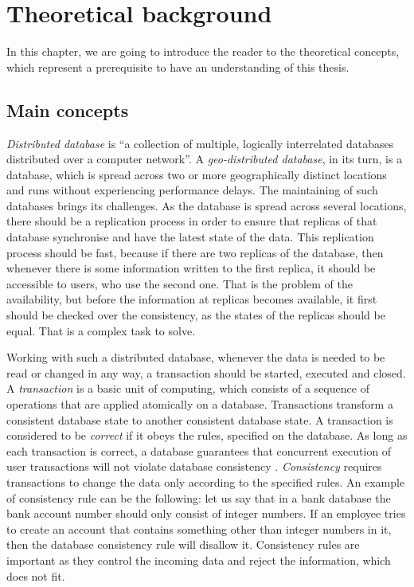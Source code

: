 \chapter{Theoretical background}
\label{Background}

In this chapter, we are going to introduce the reader to the theoretical concepts, which represent a prerequisite to have an understanding of this thesis.

\section{Main concepts}
\label{Background-Main}

\textit{Distributed database} is ``a collection of multiple, logically interrelated databases distributed over a computer network''\cite{11}. A \textit{geo-distributed database}, in its turn, is a database, which is spread across two or more geographically distinct locations and runs without experiencing performance delays. The maintaining of such databases brings its challenges. As the database is spread across several locations, there should be a replication process in order to ensure that replicas of that database synchronise and have the latest state of the data. This replication process should be fast, because if there are two replicas of the database, then whenever there is some information written to the first replica, it should be accessible to users, who use the second one. That is the problem of the availability, but before the information at replicas becomes available, it first should be checked over the consistency, as the states of the replicas should be equal. That is a complex task to solve. 

Working with such a distributed database, whenever the data is needed to be read or changed in any way, a transaction should be started, executed and closed. A \textit{transaction} is a basic unit of computing, which consists of a sequence of operations that are applied atomically on a database. Transactions transform a consistent database state to another consistent database state. A transaction is considered to be \textit{correct} if it obeys the rules, specified on the database. As long as each transaction is correct, a database guarantees that concurrent execution of user transactions will not violate database consistency \cite{11}. \textit{Consistency} requires transactions to change the data only according to the specified rules. An example of consistency rule can be the following: let us say that in a bank database the bank account number should only consist of integer numbers. If an employee tries to create an account that contains something other than integer numbers in it, then the database consistency rule will disallow it. Consistency rules are important as they control the incoming data and reject the information, which does not fit.

